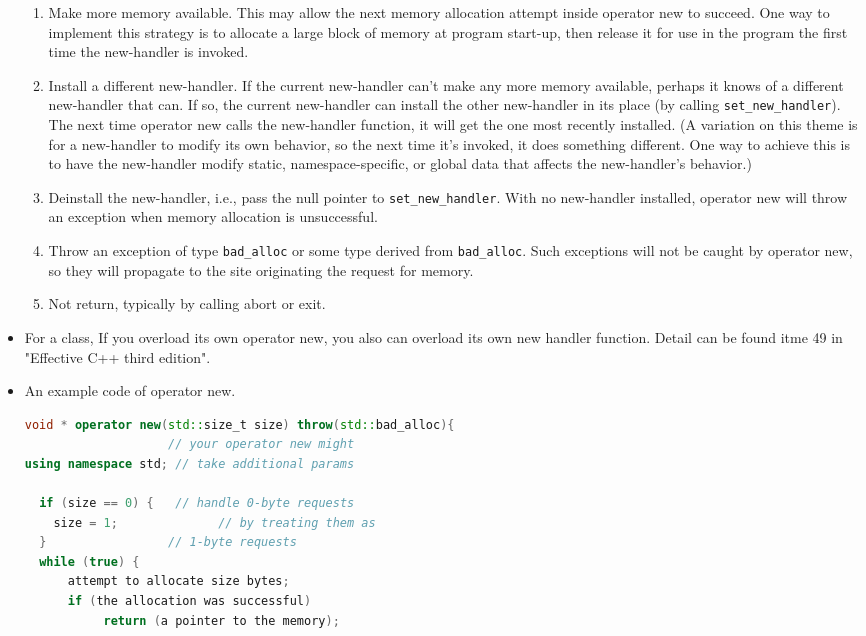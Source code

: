 \documentclass[a4paper,12pt,twoside]{book}
\begin{document}
\begin{itemize}
\begin{enumerate}
\item Make more memory available. This may allow the next memory allocation attempt inside operator new
to succeed. One way to implement this strategy is to allocate a large block of memory at program start-up, then release it for use in the program the first time the new-handler is invoked.

\item Install a different new-handler. If the current new-handler can't make any more memory available, perhaps it knows of a different new-handler that can. If so, the current new-handler can install the other new-handler in its place (by calling \texttt{set\_new\_handler}). The next time operator new calls the new-handler function, it will get the one most recently installed. (A variation on this theme is for a new-handler to modify its own behavior, so the next time it's invoked, it does something different. One way to achieve this is to have the new-handler modify static, namespace-specific, or global data that affects the new-handler's behavior.)

\item Deinstall the new-handler, i.e., pass the null pointer to \texttt{set\_new\_handler}. With no new-handler installed, operator new will throw an exception when memory allocation is unsuccessful.

\item Throw an exception of type \texttt{bad\_alloc} or some type derived from \texttt{bad\_alloc}. Such exceptions will not be caught by operator new, so they will propagate to the site originating the request for memory.

\item Not return, typically by calling abort or exit.
\end{enumerate}

\item For a class, If you overload its own operator new, you also can overload its own new handler function. Detail can be found itme 49 in "Effective C++ third edition". 

\item An example code of operator new.

\begin{lstlisting}[frame=single, language=c++]
void * operator new(std::size_t size) throw(std::bad_alloc){                      
                    // your operator new might
using namespace std; // take additional params

  if (size == 0) {   // handle 0-byte requests
    size = 1;              // by treating them as
  }                 // 1-byte requests
  while (true) {
      attempt to allocate size bytes;
      if (the allocation was successful)
           return (a pointer to the memory);


\end{lstlisting}
\end{itemize}
\end{document}
